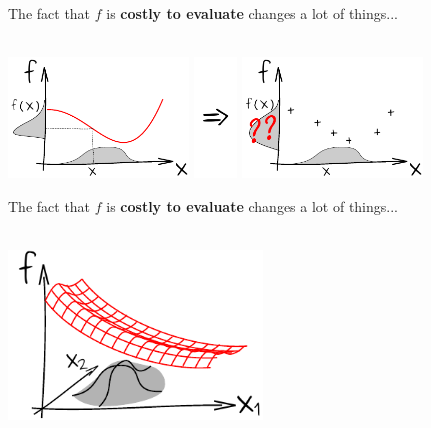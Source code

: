 \documentclass{beamer}
\begin{document}
\begin{frame}{}
The fact that $f$ is \textbf{costly to evaluate} changes a lot of things...\\
\vspace{5mm}
\\
\vspace{5mm}
\begin{center}
\includegraphics[height=3.2cm]{figures/ink_unprogf} \includegraphics[height=3.2cm]{figures/Rightarrow} \includegraphics[height=3.2cm]{figures/ink_unprogfX}
\end{center}
\end{frame}

\begin{frame}{}
The fact that $f$ is \textbf{costly to evaluate} changes a lot of things...\\
\vspace{5mm}
\\
\vspace{5mm}
\begin{center}
\includegraphics[height=4.5cm]{figures/ink_as}
\end{center}
\end{frame}
\end{document}
